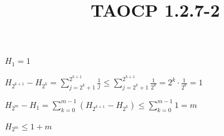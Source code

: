 \documentclass{article}
\title{TAOCP 1.2.7\mbox{-}2}
\begin{document}
\maketitle

\( H_{1} = 1 \)

\( H_{2^{k+1}} - H_{2^{k}} = \sum_{j=2^{k}+1}^{2^{k+1}} \frac{1}{j} \leq \sum_{j=2^{k}+1}^{2^{k+1}} \frac{1}{2^{k}} = 2^{k} \cdot \frac{1}{2^{k}} = 1 \)

\( H_{2^{m}} - H_{1} = \sum_{k=0}^{m-1} (H_{2^{k+1}}-H_{2^{k}}) \leq \sum_{k=0}^{m-1} 1 = m \)

\( H_{2^{m}} \leq 1 + m \)
\end{document}

